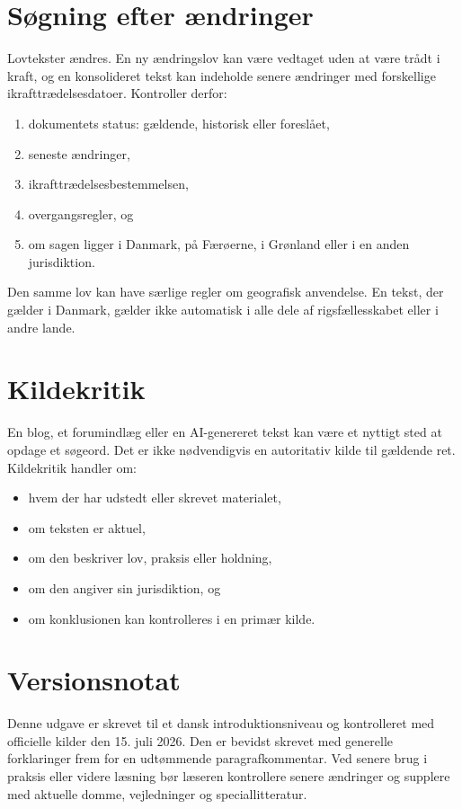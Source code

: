 \section{Søgning efter ændringer}

Lovtekster ændres. En ny ændringslov kan være vedtaget uden at være trådt i kraft, og en konsolideret tekst kan indeholde senere ændringer med forskellige ikrafttrædelsesdatoer. Kontroller derfor:
\begin{enumerate}
  \item dokumentets status: gældende, historisk eller foreslået,
  \item seneste ændringer,
  \item ikrafttrædelsesbestemmelsen,
  \item overgangsregler, og
  \item om sagen ligger i Danmark, på Færøerne, i Grønland eller i en anden jurisdiktion.
\end{enumerate}

Den samme lov kan have særlige regler om geografisk anvendelse. En tekst, der gælder i Danmark, gælder ikke automatisk i alle dele af rigsfællesskabet eller i andre lande.

\section{Kildekritik}

En blog, et forumindlæg eller en AI-genereret tekst kan være et nyttigt sted at opdage et søgeord. Det er ikke nødvendigvis en autoritativ kilde til gældende ret. Kildekritik handler om:
\begin{itemize}
  \item hvem der har udstedt eller skrevet materialet,
  \item om teksten er aktuel,
  \item om den beskriver lov, praksis eller holdning,
  \item om den angiver sin jurisdiktion, og
  \item om konklusionen kan kontrolleres i en primær kilde.
\end{itemize}

\section{Versionsnotat}

Denne udgave er skrevet til et dansk introduktionsniveau og kontrolleret med officielle kilder den 15. juli 2026. Den er bevidst skrevet med generelle forklaringer frem for en udtømmende paragrafkommentar. Ved senere brug i praksis eller videre læsning bør læseren kontrollere senere ændringer og supplere med aktuelle domme, vejledninger og speciallitteratur.

